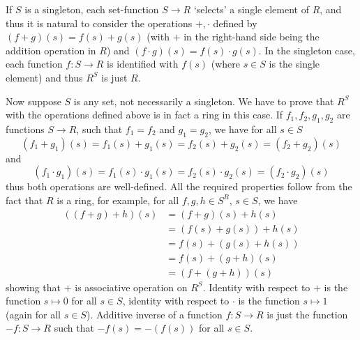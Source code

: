 \begin{solution}
	If $S$ is a singleton, each set-function $S \to R$ `selects' a single element of $R$, and thus it is natural to consider the operations $+, \cdot$ defined by $(f + g)(s) = f(s) + g(s)$ (with $+$ in the right-hand side being the addition operation in $R$) and $(f \cdot g)(s) = f(s) \cdot g(s)$. In the singleton case, each function $f: S \to R$ is identified with $f(s)$ (where $s \in S$ is the single element) and thus $R^S$ is just $R$.
	
	Now suppose $S$ is any set, not necessarily a singleton. We have to prove that $R^S$ with the operations defined above is in fact a ring in this case. If $f_1, f_2, g_1, g_2$ are functions $S \to R$, such that $f_1 = f_2$ and $g_1 = g_2$, we have for all $s \in S$
	\[
		(f_1 + g_1)(s) = f_1(s) + g_1(s) = f_2(s) + g_2(s) = (f_2 + g_2)(s)
	\]
	and
	\[
		(f_1 \cdot g_1)(s) = f_1(s) \cdot g_1(s) = f_2(s) \cdot g_2(s) = (f_2 \cdot g_2)(s)
	\]
	thus both operations are well-defined. All the required properties follow from the fact that $R$ is a ring, for example, for all $f, g, h \in S^R$, $s \in S$, we have
	\begin{align*}
		((f + g) + h)(s) &= (f+g)(s) + h(s) \\
		&= (f(s) + g(s)) + h(s) \\
		&= f(s) + (g(s) + h(s)) \\
		&= f(s) + (g+h)(s) \\
		&= (f + (g + h))(s)
	\end{align*}
	showing that $+$ is associative operation on $R^S$. Identity with respect to $+$ is the function $s \mapsto 0$ for all $s \in S$, identity with respect to $\cdot$ is the function $s \mapsto 1$ (again for all $s \in S$). Additive inverse of a function $f: S \to R$ is just the function $-f: S \to R$ such that $-f(s) = -(f(s))$ for all $s \in S$.
\end{solution}

